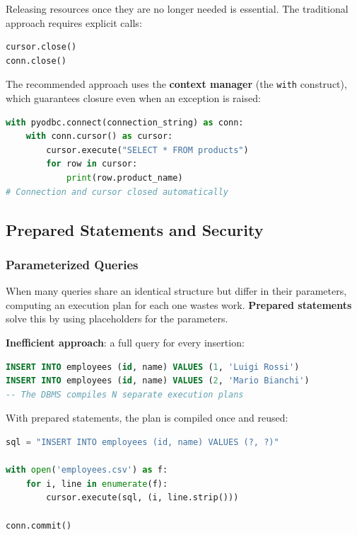 Releasing resources once they are no longer needed is essential. The traditional approach requires explicit calls:

\begin{lstlisting}[language=Python, basicstyle=\ttfamily\scriptsize]
cursor.close()
conn.close()
\end{lstlisting}

The recommended approach uses the \textbf{context manager} (the \texttt{with} construct), which guarantees closure even when an exception is raised:

\begin{lstlisting}[language=Python, basicstyle=\ttfamily\scriptsize]
with pyodbc.connect(connection_string) as conn:
    with conn.cursor() as cursor:
        cursor.execute("SELECT * FROM products")
        for row in cursor:
            print(row.product_name)
# Connection and cursor closed automatically
\end{lstlisting}

\subsection{Prepared Statements and Security}
\label{sec:prepared-statements}

\subsubsection{Parameterized Queries}
\label{subsec:parameterized-queries}

When many queries share an identical structure but differ in their parameters, computing an execution plan for each one wastes work. \textbf{Prepared statements} solve this by using placeholders for the parameters.

\begin{examplebox}
\textbf{Inefficient approach}: a full query for every insertion:
\begin{lstlisting}[language=SQL, basicstyle=\ttfamily\tiny]
INSERT INTO employees (id, name) VALUES (1, 'Luigi Rossi')
INSERT INTO employees (id, name) VALUES (2, 'Mario Bianchi')
-- The DBMS compiles N separate execution plans
\end{lstlisting}
\end{examplebox}

With prepared statements, the plan is compiled once and reused:

\begin{lstlisting}[language=Python, basicstyle=\ttfamily\scriptsize]
sql = "INSERT INTO employees (id, name) VALUES (?, ?)"

with open('employees.csv') as f:
    for i, line in enumerate(f):
        cursor.execute(sql, (i, line.strip()))

conn.commit()
\end{lstlisting}

